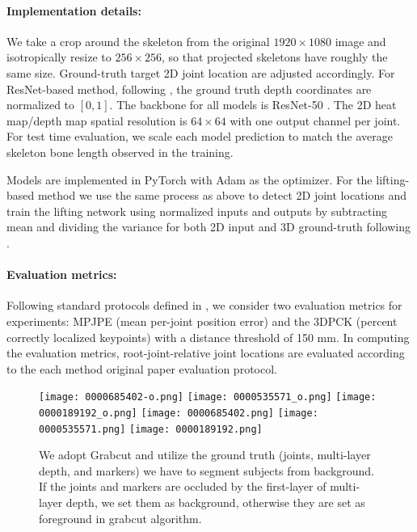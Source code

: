 \documentclass[times,referee,twocolumn,final,authoryear]{elsarticle}
\begin{document}
\paragraph{Implementation details:} We take a crop around the skeleton from the
original $1920 \times 1080$ image and isotropically resize to $256 \times
256$, so that projected skeletons have roughly the same size. Ground-truth target
2D joint location are adjusted accordingly. For ResNet-based method, following \cite{Zhou_2017_ICCV}, the
ground truth depth coordinates are normalized to $[0, 1]$.  The backbone for
all models is ResNet-50 \citep{resnet}. The 2D heat map/depth map
spatial resolution is $64 \times 64$ with one output channel per joint.
For test time 
evaluation, we scale each model prediction to match the average skeleton bone length
observed in the training. 

Models are
implemented in PyTorch with Adam as the optimizer. For the lifting-based method 
we use the same process as above to detect 2D joint locations and train the 
lifting network using normalized inputs and outputs by subtracting mean and 
dividing the variance for both 2D input and 3D ground-truth following \cite{simple}.

\paragraph{Evaluation metrics:} Following standard protocols defined in
\citep{mono_3dhp2017,h36m_pami}, we consider two evaluation metrics for
experiments: MPJPE (mean per-joint position error) and the 3DPCK (percent
correctly localized keypoints) with a distance threshold of 150 mm.  In
computing the evaluation metrics, root-joint-relative joint locations are
evaluated according to the each method original paper evaluation protocol. 


\begin{figure}[t]
\centering
\texttt{[image: 0000685402-o.png]}
\texttt{[image: 0000535571\_o.png]}
\texttt{[image: 0000189192\_o.png]}
\texttt{[image: 0000685402.png]}
\texttt{[image: 0000535571.png]}
\texttt{[image: 0000189192.png]}
\caption{We adopt Grabcut \cite{grabcut} and utilize the ground truth (joints, multi-layer depth, and markers) we have to segment subjects from background. If the joints and markers are occluded by the first-layer of multi-layer depth, we set them as background, otherwise they are set as foreground in grabcut algorithm. }
\label{fig:greenbackground}
\end{figure}
\end{document}
